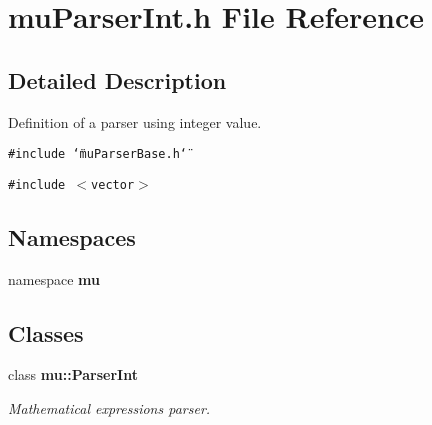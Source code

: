 \section{muParserInt.h File Reference}
\label{muParserInt_8h}


\subsection{Detailed Description}
Definition of a parser using integer value. 



{\tt \#include \char`\"{}muParserBase.h\char`\"{}}\par
{\tt \#include $<$vector$>$}\par
\subsection*{Namespaces}
\begin{CompactItemize}
\item 
namespace {\bf mu}
\end{CompactItemize}
\subsection*{Classes}
\begin{CompactItemize}
\item 
class {\bf mu::ParserInt}
\begin{CompactList}\small\item\em Mathematical expressions parser. \item\end{CompactList}\end{CompactItemize}
